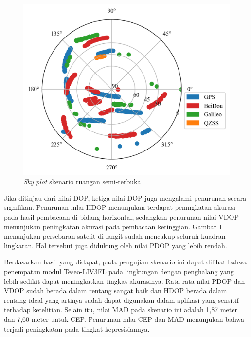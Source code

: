 \begin{figure}[H]
	\centering
	\captionsetup{justification=centering}
	\includegraphics[width=12cm]{contents/chapter-4/3-skenario-semioutdoor/sky_plot.png}
	\caption{\textit{Sky plot} skenario ruangan semi-terbuka}
	\label{Fig: semioutdoor-sky_plot}
\end{figure}


Jika ditinjau dari nilai DOP, ketiga nilai DOP juga mengalami penurunan secara signifikan. Penurunan nilai HDOP menunjukan terdapat peningkatan akurasi pada hasil pembacaan di bidang horizontal, sedangkan penurunan nilai VDOP menunjukan peningkatan akurasi pada pembacaan ketinggian. Gambar \ref{Fig: semioutdoor-sky_plot} menunjukan persebaran satelit di langit sudah mencakup seluruh kuadran lingkaran. Hal tersebut juga didukung oleh nilai PDOP yang lebih rendah.

Berdasarkan hasil yang didapat, pada pengujian skenario ini dapat dilihat bahwa penempatan modul Teseo\hyp{}LIV3FL pada lingkungan dengan penghalang yang lebih sedikit dapat meningkatkan tingkat akurasinya. Rata-rata nilai PDOP dan VDOP sudah berada dalam rentang sangat baik dan HDOP berada dalam rentang ideal yang artinya sudah dapat digunakan dalam aplikasi yang sensitif terhadap ketelitian. Selain itu, nilai MAD pada skenario ini adalah 1,87 meter dan 7,60 meter untuk CEP. Penurunan nilai CEP dan MAD menunjukan bahwa terjadi peningkatan pada tingkat kepresisiannya.

